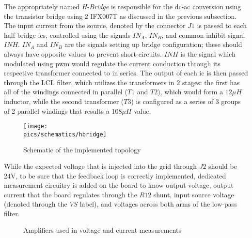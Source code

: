 The appropriately named \textit{H-Bridge} is responsible for the \gls{dc}-\gls{ac} conversion using the transistor bridge using 2 IFX007T as discussed in the previous subsection. The input current from the source, denoted by the connector $J1$ is passed to each half bridge \gls{ic}s, controlled using the signals $IN_{A}$, $IN_{B}$, and common inhibit signal $INH$.
$IN_{A}$ and $IN_{B}$ are the signals setting up bridge configuration; these should always have opposite values to prevent short-circuits.
$INH$ is the signal which modulated using \gls{pwm} would regulate the current conduction through its respective transformer connected to in series.
The output of each \gls{ic} is then passed through the LCL filter, which utilizes the transformers in 2 stages: the first has all of the windings connected in parallel ($T1$ and $T2$), which would form a $12\mu H$ inductor, while the second transformer ($T3$) is configured as a series of 3 groups of 2 parallel windings that results a $108\mu H$ value.

\begin{figure}[!ht]
    \begin{center}\texttt{[image: \\pics/schematics/hbridge]}\end{center}
    \caption{Schematic of the implemented topology}
    \label{fig:hbridgesch}
\end{figure}

While the expected voltage that is injected into the grid through $J2$ should be 24V, to be sure that the feedback loop is correctly implemented, dedicated measurement circuitry is added on the board to know output voltage, output current that the board regulates through the $R12$ shunt, input source voltage (denoted through the $VS$ label), and voltages across both arms of the low-pass filter.

\begin{figure}[!ht]
    \begin{center}
        \caption{Amplifiers used in voltage and current measurements}
        \label{fig:omapms}
    \end{center}
\end{figure}

